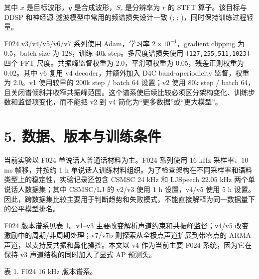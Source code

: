 其中 \(x\) 是目标波形，\(y\) 是合成波形，\(S_r\) 是分辨率为 \(r\) 的
STFT 算子。该目标与 DDSP 和神经源-滤波模型中常用的频谱损失设计一致
(;
;
)，同时保持训练过程轻量。

F024 v3/v4/v5/v6/v7 系列使用 Adam，学习率 \(2\times10^{-4}\)，gradient
clipping 为 0.5，batch size 为 128，训练 40k step。多尺度谱损失使用
\texttt{{[}127,255,511,1023{]}} 四个 FFT 尺度。共振峰监督权重为
2.0，平滑项权重为 0.05，残差正则权重为 0.02。其中 v6 复用 v4
decoder，并额外加入 D4C band-aperiodicity 监督，权重为 2.0。v1
使用较早的 200k step / batch 64 设置；v2 使用 80k step / batch
64，且关闭谱倾斜并收窄共振峰范围。这个谱系使后续比较必须区分架构变化、训练步数和监督项变化，而不能把
v2 到 v4 简化为``更多数据''或``更大模型''。

\section{5.
数据、版本与训练条件}\label{ux6570ux636eux7248ux672cux4e0eux8badux7ec3ux6761ux4ef6}

当前实验以 F024 单说话人普通话材料为主。F024 系列使用 16 kHz 采样率、10
ms 帧移，并按约 1 h
单说话人训练材料组织。为了检查架构在不同采样率和语料类型上的稳定性，实验记录还包含
CSMSC 24 kHz 和 LJSpeech 22.05 kHz 两个单说话人数据集；其中 CSMSC/LJ 的
v2/v3 使用 1 h 设置，v4/v5 使用 5 h
设置。因此，跨数据集比较主要用于判断趋势和失败模式，不能直接解释为同一数据量下的公平模型排名。

F024 版本谱系见表 1。v1--v3 主要改变解析声道约束和共振峰监督；v4/v5
改变激励中的周期/非周期处理；v7/v7b 则探索从全极点声道扩展到带零点的
ARMA 声道，以支持反共振和鼻化操控。本文以 v4 作为当前主要 F024
系统，因为它在保持 v3 声道结构的同时加入了显式 AP 预测头。

表 1. F024 16 kHz 版本谱系。

